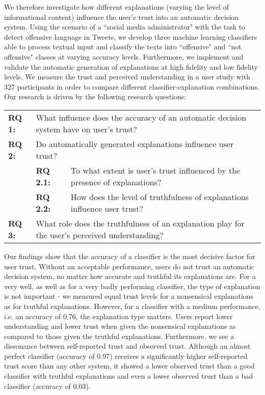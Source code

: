 We therefore investigate how different explanations (varying the level of informational content) influence the user's trust into an automatic decision system. Using the scenario of a ``social media administrator" with the task to detect offensive language in Tweets, we develop three machine learning classifiers able to process textual input and classify the texts into ``offensive" and ``not offensive" classes at varying accuracy levels. Furthermore, we implement and validate the automatic generation of explanations at high fidelity and low fidelity levels. We measure the trust and perceived understanding in a user study with 327 participants in order to compare different classifier-explanation combinations. Our research is driven by the following research questions:
\begin{table}[H]
	\centering
	\begin{tabular}{llp{8.5cm}}
		\textbf{RQ 1:} & \multicolumn{2}{p{10cm}}{What influence does the accuracy of an automatic decision system have on user's trust?} \\
		\textbf{RQ 2:} & \multicolumn{2}{p{10cm}}{Do automatically generated explanations influence user trust?} \\
		& \textbf{RQ 2.1:} & To what extent is user's trust influenced by the presence of explanations?\\
		& \textbf{RQ 2.2:} & How does the level of truthfulness of explanations influence user trust?\\
		\textbf{RQ 3:} & \multicolumn{2}{p{10cm}}{What role does the truthfulness of an explanation play for the user's perceived understanding?} \\
	\end{tabular}
\end{table}
\noindent Our findings show that the accuracy of a classifier is the most decisive factor for user trust. Without an acceptable performance, users do not trust an automatic decision system, no matter how accurate and truthful its explanations are. For a very well, as well as for a very badly performing classifier, the type of explanation is not important - we measured equal trust levels for a nonsensical explanations as for truthful explanations. However, for a classifier with a medium performance, i.e. an accuracy of 0.76, the explanation type matters. Users report lower understanding and lower trust when given the nonsensical explanations as compared to those given the truthful explanations. Furthermore, we see a dissonance between self-reported trust and observed trust. Although an almost perfect classifier (accuracy of 0.97) receives a significantly higher self-reported trust score than any other system, it showed a lower observed trust than a good classifier with truthful explanations and even a lower observed trust than a bad classifier (accuracy of 0.03).\newline
